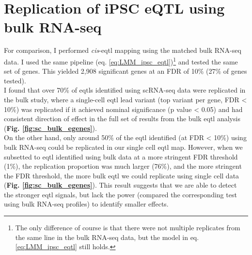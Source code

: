 \newpage

\section{Replication of iPSC eQTL using bulk RNA-seq}

For comparison, I performed \textit{cis}-\gls{eqtl} mapping using the matched bulk RNA-seq data.
I used the same pipeline (eq. \eqref{eq:LMM_ipsc_eqtl})\footnote{The only difference of course is that there were not multiple replicates from the same line in the bulk RNA-seq data, but the model in eq. \eqref{eq:LMM_ipsc_eqtl} still holds.} 
and tested the same set of genes. 
This yielded 2,908 significant genes at an FDR of 10\%
(27\% of genes tested). \\

I found that over 70\% of \glspl{eqtl} identified using scRNA-seq data were replicated in the bulk study, where a single-cell \gls{eqtl} lead variant (top variant per gene, FDR < 10\%) was replicated if it achieved nominal significance (p value < 0.05) and had consistent direction of effect in the full set of results from the bulk \gls{eqtl} analysis (\textbf{Fig. \ref{fig:sc_bulk_egenes}}). \\

On the other hand, only around 50\% of the \gls{eqtl} identified (at FDR < 10\%) using bulk RNA-seq could be replicated
in our single cell \gls{eqtl} map.
However, when we subsetted to \gls{eqtl} identified using bulk data at a more stringent FDR threshold (1\%), the replication proportion was much larger (76\%), and the more stringent the FDR threshold, the more bulk \gls{eqtl} we could replicate using single cell data (\textbf{Fig. \ref{fig:sc_bulk_egenes}}).
This result suggests that we are able to detect the stronger \gls{eqtl} signals, but lack the power (compared the corresponding test using bulk RNA-seq profiles) to identify smaller effects.

